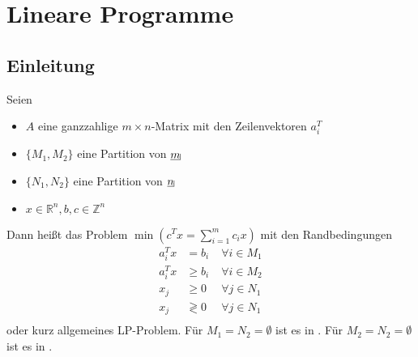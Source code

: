 \chapter{Lineare Programme}
\section{Einleitung}
\begin{definition}
Seien 
\begin{itemize}
\item $A$ eine ganzzahlige $m\times n$-Matrix mit den Zeilenvektoren $a_i^T$
\item $\{M_1,M_2\}$ eine Partition von $\laue{m}$
\item $\{N_1,N_2\}$ eine Partition von $\laue{n}$
\item $x \in \mathbb R^n, b,c \in \mathbb Z^n$
\end{itemize}
Dann heißt das Problem $\min(c^Tx = \sum_{i=1}^m c_ix)$ mit den Randbedingungen
\begin{align*}
a_i^Tx &= b_i \; &\forall i \in M_1 \\
a_i^Tx &\geq b_i \; &\forall i \in M_2 \\
x_j &\geq 0 \; &\forall j \in N_1 \\
x_j &\gtrless 0 \; &\forall j \in N_1 \\
\end{align*}
 oder kurz allgemeines LP-Problem.\newline %
Für $M_1 = N_2 = \emptyset$ ist es in .\newline %
Für $M_2 = N_2 = \emptyset$ ist es in .
\end{definition}

